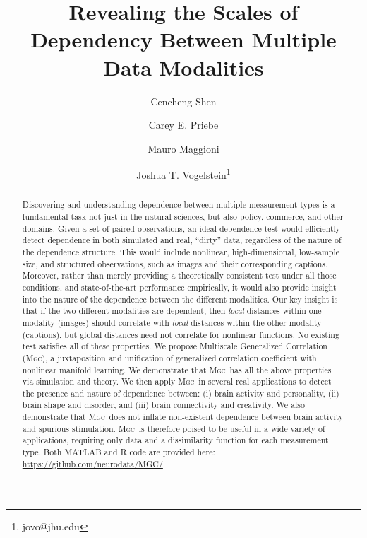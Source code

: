\documentclass[11pt]{article}
\providecommand{\sct}[1]{{\normalfont\textsc{#1}}}
\newcommand{\Mgc}{\sct{Mgc}}
\newcommand{\website}{\url{https://github.com/neurodata/MGC/}}
\begin{document}
\def\spacingset#1{\renewcommand{\baselinestretch}%
{#1}\small\normalsize} \spacingset{1}

\title{\bf Revealing the Scales of Dependency Between Multiple Data Modalities}
\author[1,2]{Cencheng Shen} %
\author[2,3]{Carey E. Priebe}%
\author[3,4,6]{Mauro Maggioni}%
\author[2,5]{Joshua T. Vogelstein\thanks{jovo@jhu.edu}}
\maketitle

\begin{abstract}
Discovering and understanding dependence between multiple  measurement types is a fundamental task not just in the natural sciences, but also policy, commerce, and other domains.
Given a set of paired observations, an ideal dependence test would efficiently detect dependence in both simulated and real, ``dirty'' data, regardless of the nature of the dependence structure. This would include nonlinear,  high-dimensional, low-sample size, and structured observations, such as images and their corresponding captions.  Moreover, rather than merely providing a theoretically consistent test under all those conditions, and state-of-the-art performance empirically, it would also provide insight into the nature of the dependence between the different modalities.  
Our key insight is that if the two different modalities are dependent, then \emph{local} distances within one modality (images) should correlate with \emph{local} distances within the other modality (captions), but global distances need not correlate for  nonlinear functions.  
No existing test satisfies all of these properties.
We propose Multiscale Generalized Correlation (\Mgc), a juxtaposition and unification of  generalized correlation coefficient with nonlinear manifold learning.
We demonstrate that \Mgc~has all the above properties via simulation and theory.
We then apply \Mgc~in several real applications to detect the presence and nature  of dependence between: (i)  brain activity and personality, (ii) brain shape and disorder, and (iii) brain connectivity and creativity. We also demonstrate that \Mgc~does not inflate non-existent dependence between brain activity and spurious stimulation.  
\Mgc~is therefore poised to be useful in a wide variety of applications, requiring only data and a dissimilarity function for each measurement type.  Both MATLAB and R code are provided here: \website.
\end{abstract}
\end{document}
